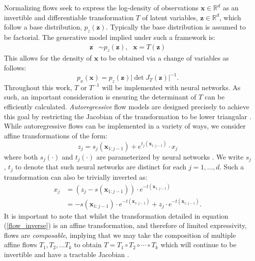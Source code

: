 \documentclass{article}
\begin{document}
Normalizing flows seek to express the log-density of observations 
$\textbf{x}\in\mathbb{R}^d$ as an invertible and differentiable 
transformation $T$ of latent variables, $\mathbf{z}\in\mathbb{R}^d$,
which follow a base distribution,  $p_{{z}}(\mathbf{z})$. Typically the base distribution is 
assumed to be factorial. 
The generative model implied under such a framework is:
\begin{align}
\mathbf{z} &\sim p_z (\mathbf{z}), ~~~
\mathbf{x} = T( \mathbf{z})
\end{align}
This allows for the density of $\mathbf{x}$ to be obtained via a change of variables as follows:
\begin{equation}
p_x(\mathbf{x}) = p_{{z}}(\mathbf{z}) | \det J_T(\mathbf{z} )|^{-1}   .
\label{flow_inverse}
\end{equation} 
Throughout this work,  $T$ or $T^{-1}$ will be implemented with neural networks. As such,  an important consideration 
is ensuring the determinant of $T$ can be efficiently calculated. 
\textit{Autoregressive} flow models are designed precisely to achieve this goal by restricting the 
Jacobian of the transformation to be lower triangular \citep{huang2018neural}. 
While autoregressive flows can be implemented in a variety of ways, we consider 
affine transformations of the form:
\begin{equation}
z_j = s_j( \mathbf{x}_{1:j-1} ) + e^{t_j( \mathbf{x}_{1:j-1}  )} \cdot x_j
\end{equation}
where both $s_j(\cdot)$ and $t_j(\cdot)$ are parameterized by neural networks \citep{dinh2016density}. 
We write $s_j$, $t_j$ to denote that such neural networks are distinct for each
$j = 1, \ldots, d$. 
Such a transformation can also be trivially inverted as:
\begin{align}
\label{flow_inverse_1}
x_j &= \left (z_j - s( \mathbf{x}_{1:j-1} ) \right ) \cdot  e^{-t( \mathbf{x}_{1:j-1}  )} \\
&= - s( \mathbf{x}_{1:j-1} ) \cdot  e^{-t( \mathbf{x}_{1:j-1}  )} +  z_j \cdot  e^{-t( \mathbf{x}_{1:j-1}  )} .
\label{flow_inverse_2}
\end{align}
It is important to note that whilst the transformation detailed in 
equation (\ref{flow_inverse}) is an affine transformation, and therefore of limited expressivity, 
flows are \textit{composable}, implying that we may take the composition of multiple affine flows
$T_1, T_2, \ldots T_k$  to obtain $T = T_1 \circ T_2 \circ \cdots \circ T_k $ which will continue to be 
invertible and have a tractable Jacobian \citep{papamakarios2019normalizing}.
\end{document}
